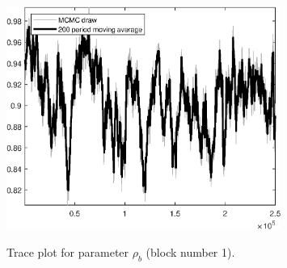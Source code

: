 \begin{figure}[H]
\centering
  \includegraphics[width=0.8\textwidth]{BRS_aggregate/graphs/TracePlot_rho_b_blck_1}\\
    \caption{Trace plot for parameter ${\rho_b}$ (block number 1).}
\end{figure}
